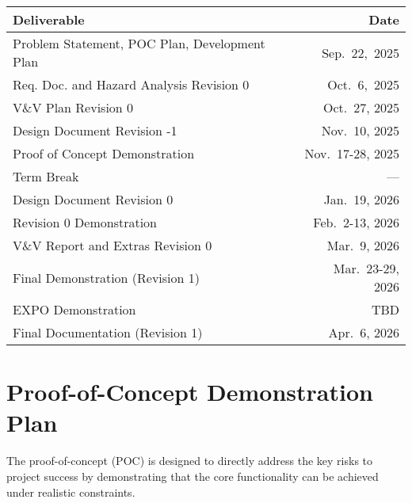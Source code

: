\documentclass{article}
\begin{document}
\begin{tabularx}{\textwidth}{@{}X r@{}}
    \toprule
    \textbf{Deliverable}                            & \textbf{Date}       \\
    \midrule
    Problem Statement, POC Plan, Development Plan   & Sep.\ 22,\ 2025     \\
    Req. Doc. and Hazard Analysis Revision 0        & Oct.\ 6,\ 2025      \\
    V\&V Plan Revision 0                            & Oct.\ 27, 2025      \\
    Design Document Revision -1                     & Nov.\ 10, 2025      \\
    Proof of Concept Demonstration                  & Nov.\ 17-28, 2025   \\
    Term Break                                      & ---                    \\
    Design Document Revision 0                      & Jan.\ 19, 2026      \\
    Revision 0 Demonstration                        & Feb.\ 2-13, 2026    \\
    V\&V Report and Extras Revision 0               & Mar.\ 9, 2026       \\
    Final Demonstration (Revision 1)                & Mar.\ 23-29, 2026   \\
    EXPO Demonstration                              & TBD                 \\
    Final Documentation (Revision 1)                & Apr.\ 6, 2026       \\
    \bottomrule
\end{tabularx}



\section{Proof-of-Concept Demonstration Plan}

The proof-of-concept (POC) is designed to directly address the key risks to project success by demonstrating that the core functionality can be achieved under realistic constraints.
\end{document}

